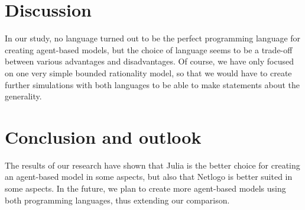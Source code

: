 \documentclass[runningheads]{llncs}
\begin{document}
\hypertarget{discussion}{%
\section{Discussion}\label{discussion}}

In our study, no language turned out to be the perfect programming
language for creating agent-based models, but the choice of language
seems to be a trade-off between various advantages and disadvantages. Of
course, we have only focused on one very simple bounded rationality
model, so that we would have to create further simulations with both
languages to be able to make statements about the generality.

\hypertarget{conclusion-and-outlook}{%
\section{Conclusion and outlook}\label{conclusion-and-outlook}}

The results of our research have shown that Julia is the better choice
for creating an agent-based model in some aspects, but also that Netlogo
is better suited in some aspects. In the future, we plan to create more
agent-based models using both programming languages, thus extending our
comparison.


%
%
%
%
%
\printbibliography
\end{document}
